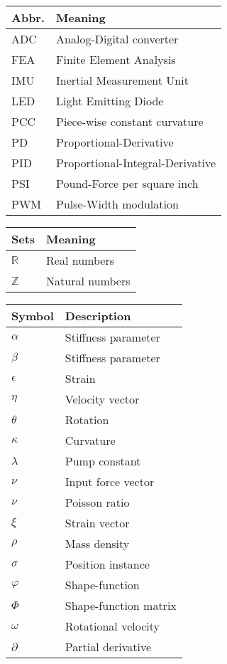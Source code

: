 \begin{spacing}{0.9}
\begin{multicols}{2}
\begin{table}[H]
\centering
    \begin{tabular}{p{1.5cm} p{5cm}} \hline
    \textbf{Abbr.}    &   \textbf{Meaning }\\ \hline
    ADC     &  Analog-Digital converter\\
    FEA     &  Finite Element Analysis \\
    IMU    & Inertial Measurement Unit \\
    LED   & Light Emitting Diode \\
    PCC   & Piece-wise constant curvature \\
    PD    & Proportional-Derivative \\
    PID    & Proportional-Integral-Derivative \\
    PSI    & Pound-Force per square inch\\
    PWM    & Pulse-Width modulation\\  \hline
    \end{tabular}
\end{table}

\begin{table}[H]
\centering
    \begin{tabular}{p{1.5cm} p{5cm}} \hline
    \textbf{Sets}    &   \textbf{Meaning }\\ \hline
    $\mathbb{R}$     &  Real numbers \\
    $\mathbb{Z}$     &  Natural numbers \\  \hline
    \end{tabular}
\end{table}


\begin{table}[H]
\centering
    \begin{tabular}{p{1.5cm} p{5cm}} \hline
    \textbf{Symbol}    &   \textbf{Description }\\ \hline
    $\alpha$     &  Stiffness parameter \\
    $\beta$     &  Stiffness parameter \\
    $\epsilon$     &  Strain \\
    $\eta$     &  Velocity vector \\
    
    $\theta$      & Rotation \\
    $\kappa$     &  Curvature \\
    $\lambda$    &  Pump constant \\
    $\nu$     &  Input force vector \\
    $\nu$     &  Poisson ratio \\
    $\xi$     &  Strain vector \\
    $\rho$     &  Mass density \\
    $\sigma$     &  Position instance \\
    $\varphi$     &  Shape-function \\
    $\Phi$    &  Shape-function matrix \\
    $\omega$     &  Rotational velocity \\
    $\partial$     &  Partial derivative \\ \hline
    

\end{tabular}
\end{table}
\end{multicols}
\end{spacing}
